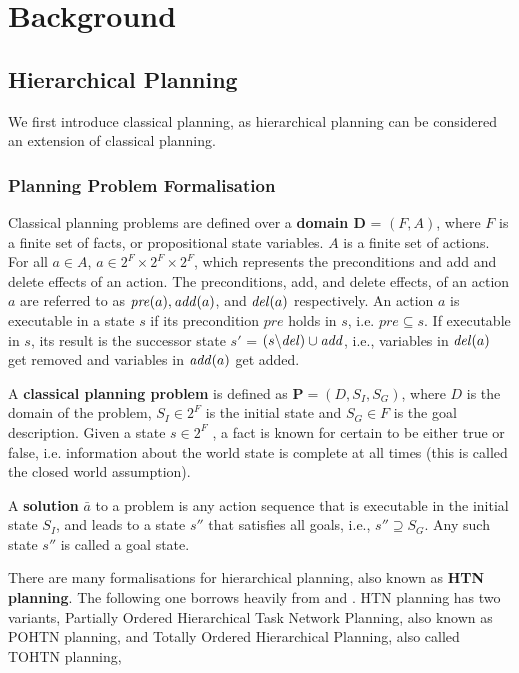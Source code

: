 \chapter{Background}\label{chap:background}

\section{Hierarchical Planning}
We first introduce classical planning, as hierarchical
planning can be considered an extension of classical planning.

\subsection{Planning Problem Formalisation}
Classical planning problems are defined over a \textbf{domain D} = $(F, A)$, where 
$F$ is a finite set of facts, or propositional state variables.
$A$ is a finite set of actions. 
For all $a \in A$,  $a \in 2^F \times 2^F \times 2^F$, which represents the preconditions and add and delete effects of an action. %
The preconditions, add, and delete effects, of an action $a$ are referred to as $\mathit{pre}(a), \mathit{add}(a)$, and $\mathit{del}(a)$ respectively.
An action $a$ is executable in a state $s$ if its precondition $pre$ holds in $s$, i.e. $pre \subseteq s$. 
If executable in $s$, its result is the successor state $s'$ = $(s \backslash \mathit{del}) \cup \mathit{add}$, i.e., variables in $\mathit{del}(a)$ get removed and variables in $\mathit{add}(a)$ get added.

A \textbf{classical planning problem} is defined as $\textbf{P} = (D, S_I, S_G)$, 
where $D$ is the domain of the problem, 
$S_I \in 2^F$ is the initial state and $S_G \in F$ is the goal description.
Given a state $s \in 2^F$ , a fact is known for certain to be either true or false, i.e. information about the world state is complete at all times (this is called the closed world assumption).

A \textbf{solution} $\bar{a}$ to a problem is any action sequence that is executable in the initial state $S_I$, and leads to a state $s''$ that satisfies all
goals, i.e., $s'' \supseteq S_G$. Any such state $s''$ is called a goal state.


There are many formalisations for hierarchical planning, also known as \textbf{HTN planning}. The following one borrows heavily from \cite{HTNSurvey} and \cite{Geier2011TIHTNDecidability}. HTN planning has two variants, Partially Ordered Hierarchical Task Network Planning, also known as POHTN planning, and Totally Ordered Hierarchical Planning, also called TOHTN planning,   %

